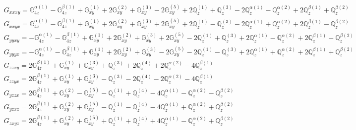 \documentclass[fleqn,8pt,landscape]{jsarticle}
\begin{document}
\begin{align*}
& G_{xxxy} = \mathbb{G}_{4z}^{\alpha(1)} - \mathbb{G}_{4z}^{\beta(1)} + \mathbb{G}_{xy}^{(1)} + 2 \mathbb{G}_{xy}^{(2)} + \mathbb{G}_{xy}^{(3)} - 2 \mathbb{G}_{xy}^{(5)} + 2 \mathbb{Q}_{z}^{(1)} + \mathbb{Q}_{z}^{(3)} - 2 \mathbb{Q}_{z}^{\alpha(1)} - \mathbb{Q}_{z}^{\alpha(2)} + 2 \mathbb{Q}_{z}^{\beta(1)} + \mathbb{Q}_{z}^{\beta(2)} \\
& G_{xxyx} = \mathbb{G}_{4z}^{\alpha(1)} - \mathbb{G}_{4z}^{\beta(1)} + \mathbb{G}_{xy}^{(1)} + 2 \mathbb{G}_{xy}^{(2)} + \mathbb{G}_{xy}^{(3)} + 2 \mathbb{G}_{xy}^{(5)} + 2 \mathbb{Q}_{z}^{(1)} - \mathbb{Q}_{z}^{(3)} - 2 \mathbb{Q}_{z}^{\alpha(1)} + \mathbb{Q}_{z}^{\alpha(2)} + 2 \mathbb{Q}_{z}^{\beta(1)} - \mathbb{Q}_{z}^{\beta(2)} \\
& G_{yyxy} = - \mathbb{G}_{4z}^{\alpha(1)} - \mathbb{G}_{4z}^{\beta(1)} + \mathbb{G}_{xy}^{(1)} + 2 \mathbb{G}_{xy}^{(2)} + \mathbb{G}_{xy}^{(3)} + 2 \mathbb{G}_{xy}^{(5)} - 2 \mathbb{Q}_{z}^{(1)} + \mathbb{Q}_{z}^{(3)} + 2 \mathbb{Q}_{z}^{\alpha(1)} - \mathbb{Q}_{z}^{\alpha(2)} + 2 \mathbb{Q}_{z}^{\beta(1)} - \mathbb{Q}_{z}^{\beta(2)} \\
& G_{yyyx} = - \mathbb{G}_{4z}^{\alpha(1)} - \mathbb{G}_{4z}^{\beta(1)} + \mathbb{G}_{xy}^{(1)} + 2 \mathbb{G}_{xy}^{(2)} + \mathbb{G}_{xy}^{(3)} - 2 \mathbb{G}_{xy}^{(5)} - 2 \mathbb{Q}_{z}^{(1)} - \mathbb{Q}_{z}^{(3)} + 2 \mathbb{Q}_{z}^{\alpha(1)} + \mathbb{Q}_{z}^{\alpha(2)} + 2 \mathbb{Q}_{z}^{\beta(1)} + \mathbb{Q}_{z}^{\beta(2)} \\
& G_{zzxy} = 2 \mathbb{G}_{4z}^{\beta(1)} + \mathbb{G}_{xy}^{(1)} + \mathbb{G}_{xy}^{(3)} + \mathbb{Q}_{z}^{(3)} + 2 \mathbb{Q}_{z}^{(4)} + 2 \mathbb{Q}_{z}^{\alpha(2)} - 4 \mathbb{Q}_{z}^{\beta(1)} \\
& G_{zzyx} = 2 \mathbb{G}_{4z}^{\beta(1)} + \mathbb{G}_{xy}^{(1)} + \mathbb{G}_{xy}^{(3)} - \mathbb{Q}_{z}^{(3)} - 2 \mathbb{Q}_{z}^{(4)} - 2 \mathbb{Q}_{z}^{\alpha(2)} - 4 \mathbb{Q}_{z}^{\beta(1)} \\
& G_{yzzx} = 2 \mathbb{G}_{4z}^{\beta(1)} + \mathbb{G}_{xy}^{(2)} - \mathbb{G}_{xy}^{(5)} - \mathbb{Q}_{z}^{(1)} + \mathbb{Q}_{z}^{(4)} - 4 \mathbb{Q}_{z}^{\alpha(1)} - \mathbb{Q}_{z}^{\alpha(2)} - \mathbb{Q}_{z}^{\beta(2)} \\
& G_{yzxz} = 2 \mathbb{G}_{4z}^{\beta(1)} + \mathbb{G}_{xy}^{(2)} + \mathbb{G}_{xy}^{(5)} - \mathbb{Q}_{z}^{(1)} - \mathbb{Q}_{z}^{(4)} - 4 \mathbb{Q}_{z}^{\alpha(1)} + \mathbb{Q}_{z}^{\alpha(2)} + \mathbb{Q}_{z}^{\beta(2)} \\
& G_{zxyz} = 2 \mathbb{G}_{4z}^{\beta(1)} + \mathbb{G}_{xy}^{(2)} + \mathbb{G}_{xy}^{(5)} + \mathbb{Q}_{z}^{(1)} + \mathbb{Q}_{z}^{(4)} + 4 \mathbb{Q}_{z}^{\alpha(1)} - \mathbb{Q}_{z}^{\alpha(2)} + \mathbb{Q}_{z}^{\beta(2)} \\

\end{align*}
\end{document}
